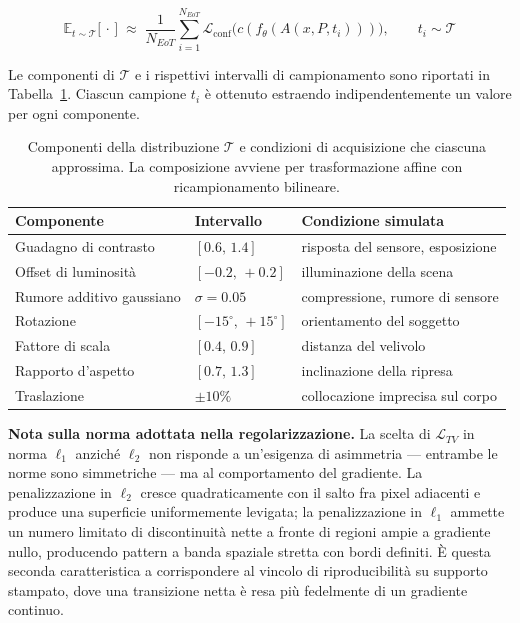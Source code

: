 \begin{equation}
\label{eq:eot_montecarlo}
\mathbb{E}_{t \sim \mathcal{T}}\big[\,\cdot\,\big] \;\approx\;
\frac{1}{N_{EoT}} \sum_{i=1}^{N_{EoT}} \mathcal{L}_{\text{conf}}
\big(c(f_\theta(A(x,P,t_i)))\big), \qquad t_i \sim \mathcal{T}
\end{equation}

Le componenti di $\mathcal{T}$ e i rispettivi intervalli di campionamento sono
riportati in Tabella~\ref{tab:eot_parametri}. Ciascun campione $t_i$ è ottenuto
estraendo indipendentemente un valore per ogni componente.

\begin{table}[htbp]
\centering
\begin{tabular}{lll}
\toprule
\textbf{Componente} & \textbf{Intervallo} & \textbf{Condizione simulata} \\
\midrule
Guadagno di contrasto & $[0.6,\,1.4]$ & risposta del sensore, esposizione \\
Offset di luminosità & $[-0.2,\,+0.2]$ & illuminazione della scena \\
Rumore additivo gaussiano & $\sigma = 0.05$ & compressione, rumore di sensore \\
Rotazione & $[-15^{\circ},\,+15^{\circ}]$ & orientamento del soggetto \\
Fattore di scala & $[0.4,\,0.9]$ & distanza del velivolo \\
Rapporto d'aspetto & $[0.7,\,1.3]$ & inclinazione della ripresa \\
Traslazione & $\pm 10\%$ & collocazione imprecisa sul corpo \\
\bottomrule
\end{tabular}
\caption{Componenti della distribuzione $\mathcal{T}$ e condizioni di
acquisizione che ciascuna approssima. La composizione avviene per
trasformazione affine con ricampionamento bilineare.}
\label{tab:eot_parametri}
\end{table}

\textbf{Nota sulla norma adottata nella regolarizzazione.}
La scelta di $\mathcal{L}_{TV}$ in norma $\ell_1$ anziché $\ell_2$ non risponde
a un'esigenza di asimmetria — entrambe le norme sono simmetriche — ma al
comportamento del gradiente. La penalizzazione in $\ell_2$ cresce
quadraticamente con il salto fra pixel adiacenti e produce una superficie
uniformemente levigata; la penalizzazione in $\ell_1$ ammette un numero
limitato di discontinuità nette a fronte di regioni ampie a gradiente nullo,
producendo pattern a banda spaziale stretta con bordi definiti. È questa
seconda caratteristica a corrispondere al vincolo di riproducibilità su
supporto stampato, dove una transizione netta è resa più fedelmente di un
gradiente continuo.


